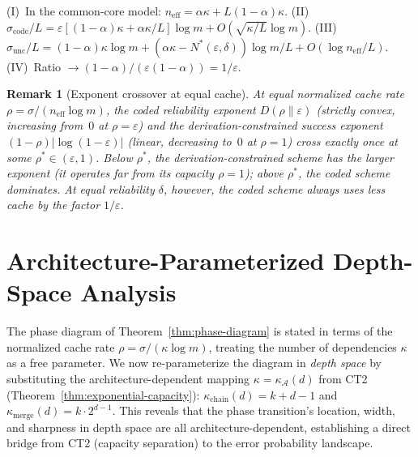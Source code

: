 \documentclass[journal]{IEEEtran}
\makeatletter
\newtheorem{remark}{Remark}[section]
\numberwithin{equation}{section}
\renewenvironment{proof}[1][\proofname]{\par
  \pushQED{\qed}%
  \normalfont \topsep6\p@\@plus6\p@\relax
  \trivlist
  \item[\hskip\labelsep
        \itshape
    #1\@addpunct{.}]\ignorespaces
}{%
  \popQED\endtrivlist\@endpefalse
}
\makeatother
\begin{document}
\begin{proof}
(I)~In the common-core model:
$n_{\mathrm{eff}}=\alpha\kappa+L(1{-}\alpha)\kappa$.
(II)~$\sigma_{\mathrm{code}}/L
=\varepsilon[(1{-}\alpha)\kappa
+\alpha\kappa/L]\log m+O(\sqrt{\kappa/L}\log m)$.
(III)~$\sigma_{\mathrm{unc}}/L
=(1{-}\alpha)\kappa\log m
+(\alpha\kappa{-}N^*(\varepsilon,\delta))\log m/L
+O(\log n_{\mathrm{eff}}/L)$.
(IV)~Ratio $\to(1{-}\alpha)/(\varepsilon(1{-}\alpha))
=1/\varepsilon$.
\end{proof}

\begin{remark}[Exponent crossover at equal cache]
\label{rem:crossover-mq}
At equal normalized cache rate
$\rho=\sigma/(n_{\mathrm{eff}}\log m)$, the coded
reliability exponent $D(\rho\|\varepsilon)$
\textup{(}strictly convex, increasing from~$0$ at
$\rho=\varepsilon$\textup{)} and the
derivation-constrained success exponent
$(1{-}\rho)|\!\log(1{-}\varepsilon)|$
\textup{(}linear, decreasing to~$0$ at $\rho=1$\textup{)}
cross exactly once at some $\rho^*\in(\varepsilon,1)$.
Below $\rho^*$, the derivation-constrained scheme has the
larger exponent \textup{(}it operates far from its
capacity $\rho=1$\textup{)};
above $\rho^*$, the coded scheme dominates.
At equal \emph{reliability} $\delta$, however, the coded
scheme always uses less cache by the factor
$1/\varepsilon$.
\end{remark}


\section{Architecture-Parameterized Depth-Space Analysis}
\label{sec:arch-depth}

The phase diagram of Theorem~\ref{thm:phase-diagram} is stated
in terms of the normalized cache rate
$\rho=\sigma/(\kappa\log m)$, treating the number of
dependencies $\kappa$ as a free parameter.
We now re-parameterize the diagram in \emph{depth space} by
substituting the architecture-dependent mapping
$\kappa=\kappa_{\mathcal A}(d)$ from CT2
(Theorem~\ref{thm:exponential-capacity}):
$\kappa_{\mathrm{chain}}(d)=k{+}d{-}1$ and
$\kappa_{\mathrm{merge}}(d)=k\cdot 2^{d-1}$.
This reveals that the phase transition's location, width, and
sharpness in depth space are all architecture-dependent,
establishing a direct bridge from CT2 (capacity separation) to
the error probability landscape.
\end{document}
